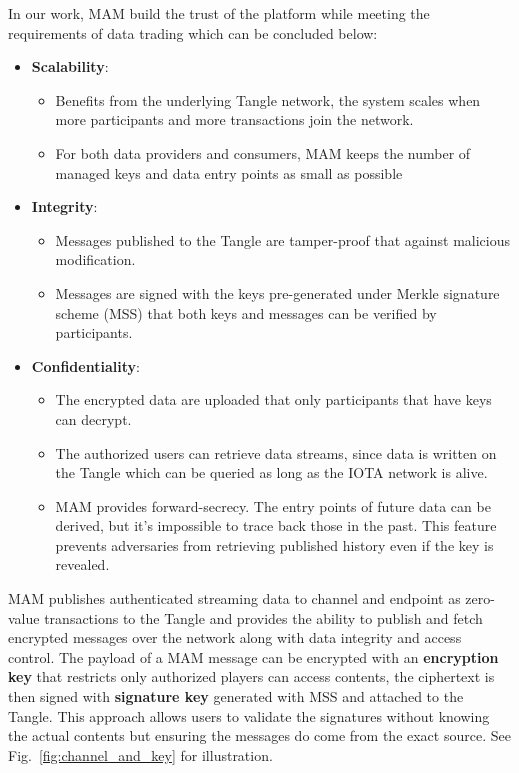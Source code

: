 \documentclass[conference]{IEEEtran}
\begin{document}
In our work, MAM build the trust of the platform while meeting the requirements of data trading which can be concluded below:

\begin{itemize}
    \item \textbf{Scalability}:
	\begin{itemize}
		\item Benefits from the underlying Tangle network, the system scales when more participants and more transactions join the network. 
    	\item For both data providers and consumers, MAM keeps the number of managed keys and data entry points as small as possible
    \end{itemize}    
    \item \textbf{Integrity}: 
	\begin{itemize}    	
        \item Messages published to the Tangle are tamper-proof that against malicious modification.
    	\item Messages are signed with the keys pre-generated under Merkle signature scheme\cite{MSS} (MSS) that both keys and messages can be verified by participants.
    \end{itemize}
    \item \textbf{Confidentiality}:
    \begin{itemize}    	
    	\item The encrypted data are uploaded that only participants that have keys can decrypt.
    	\item The authorized users can retrieve data streams, since data is written on the Tangle which can be queried as long as the IOTA network is alive.
    	\item MAM provides forward-secrecy. The entry points of future data can be derived, but it's impossible to trace back those in the past. This feature prevents adversaries from retrieving published history even if the key is revealed.
    \end{itemize}
\end{itemize}

MAM publishes authenticated streaming data to channel and endpoint as zero-value transactions to the Tangle and provides the ability to publish and fetch encrypted messages over the network along with data integrity and access control. The payload of a MAM message can be encrypted with an \textbf{encryption key} that restricts only authorized players can access contents, the ciphertext is then signed with \textbf{signature key} generated with MSS and attached to the Tangle. This approach allows users to validate the signatures without knowing the actual contents but ensuring the messages do come from the exact source. See Fig.~\ref{fig:channel_and_key} for illustration. 
\end{document}
